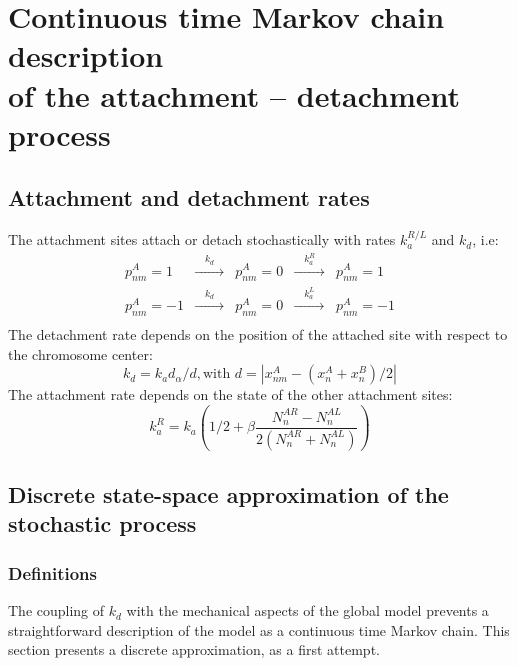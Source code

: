 \documentclass[a4paper,12pt]{article}
\begin{document}
\section{Continuous time Markov chain description\\
 of the attachment -- detachment process}
\label{sec:markov}


\subsection{Attachment and detachment rates}

The attachment sites attach or detach stochastically with rates $k_a^{R/L}$
and $k_d$, i.e:
\begin{equation}
  \begin{aligned}
    p_{nm}^A = 1 &\xrightarrow{\quad k_d \quad}& p_{nm}^A = 0%
    &\xrightarrow{\quad k_a^R \quad}& p_{nm}^A = 1\\
    p_{nm}^A= -1 &\xrightarrow{\quad k_d \quad}& p_{nm}^A = 0%
    &\xrightarrow{\quad k_a^L \quad}& p_{nm}^A = -1\\
  \end{aligned}
\end{equation}
The detachment rate depends on the position of the attached site with
respect to the chromosome center:
\begin{equation}
  \label{eq:k_d}
  k_d = k_ad_\alpha / d, \mbox{with } d = \left| x^A_{nm} - %
  \left(x^A_{n}+ x^B_{n}\right) / 2 \right|
\end{equation}
The attachment rate depends on the state of the other attachment
sites:
\begin{equation}
  \label{eq:k_a}
  k_a^R = k_a\left( 1/2 + \beta\frac{N_n^{AR} - N_n^{AL}}%
    {2\left(N_n^{AR} + N_n^{AL}\right)}\right)
\end{equation}
  
\subsection{Discrete state-space approximation of the stochastic
  process}
\label{sec:Defintions}

\subsubsection{Definitions}

The coupling of $k_d$ with the mechanical aspects of the global model
prevents a straightforward description of the model as a continuous
time Markov chain. This section presents a discrete approximation, as
a first attempt.
\end{document}
